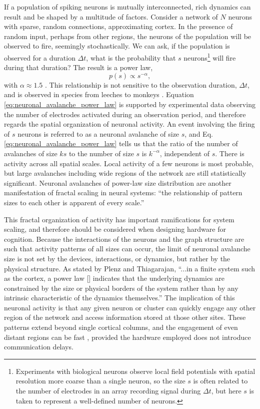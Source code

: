 If a population of spiking neurons is mutually interconnected, rich dynamics can result and be shaped by a multitude of factors. Consider a network of $N$ neurons with sparse, random connections, approximating cortex. In the presence of random input, perhaps from other regions, the neurons of the population will be observed to fire, seemingly stochastically. We can ask, if the population is observed for a duration $\Delta t$, what is the probability that $s$ neurons\footnote{Experiments with biological neurons observe local field potentials with spatial resolution more coarse than a single neuron, so the size $s$ is often related to the number of electrodes in an array recording signal during $\Delta t$, but here $s$ is taken to represent a well-defined number of neurons.} will fire during that duration? The result is a power law,
\begin{equation}
\label{eq:neuronal_avalanche_power_law}
p(s) \propto s^{-\alpha},
\end{equation}
with $\alpha \approx 1.5$ \cite{plth2006,be2007}. This relationship is not sensitive to the observation duration, $\Delta t$, and is observed in species from leeches \cite{be2007} to monkeys \cite{peth2009}. Equation \ref{eq:neuronal_avalanche_power_law} is supported by experimental data observing the number of electrodes activated during an observation period, and therefore regards the spatial organization of neuronal activity. An event involving the firing of $s$ neurons is referred to as a neuronal avalanche \cite{bepl2003} of size $s$, and Eq.\,\ref{eq:neuronal_avalanche_power_law} tells us that the ratio of the number of avalanches of size $ks$ to the number of size $s$ is $k^{-\alpha}$, independent of $s$. There is activity across all spatial scales. Local activity of a few neurons is most probable, but large avalanches including wide regions of the network are still statistically significant. Neuronal avalanches of power-law size distribution are another manifestation of fractal scaling in neural systems: ``the relationship of pattern sizes to each other is apparent of every scale.'' \cite{plth2006} 

This fractal organization of activity has important ramifications for system scaling, and therefore should be considered when designing hardware for cognition. Because the interactions of the neurons and the graph structure are such that activity patterns of all sizes can occur, the limit of neuronal avalanche size is not set by the devices, interactions, or dynamics, but rather by the physical structure. As stated by Plenz and Thiagarajan, ``...in a finite system such as the cortex, a power law [] indicates that the underlying dynamics are constrained by the size or physical borders of the system rather than by any intrinsic characteristic of the dynamics themselves.'' \cite{plth2006} The implication of this neuronal activity is that any given neuron or cluster can quickly engage any other region of the network and access information stored at those other sites. These patterns extend beyond single cortical columns, and the engagement of even distant regions can be fast \cite{plth2006}, provided the hardware employed does not introduce communication delays.

